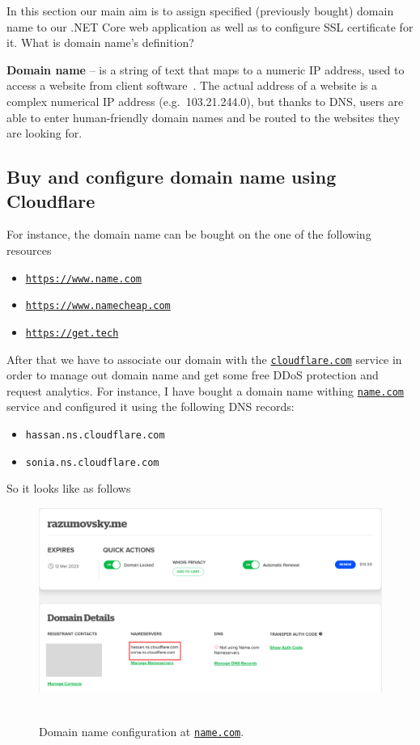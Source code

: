 In this section our main aim is to assign specified (previously bought) domain name to our .NET Core web application
as well as to configure SSL certificate for it.
What is domain name's definition?
\begin{center}
    \textbf{Domain name} -- is a string of text that maps to a numeric IP address, used to access a website
    from client software~\cite{DomanNameCloudflare}.
    The actual address of a website is a complex numerical IP address (e.g.\ 103.21.244.0), but thanks to DNS,
    users are able to enter human-friendly domain names and be routed to the websites they are looking for.
\end{center}

\subsection{Buy and configure domain name using Cloudflare}\label{subsec:buy-and-configure-domain-name-using-cloudflare}
For instance, the domain name can be bought on the one of the following resources
\begin{itemize}
    \item \href{https://www.name.com/}{\texttt{https://www.name.com}}
    \item \href{https://www.namecheap.com/}{\texttt{https://www.namecheap.com}}
    \item \href{https://get.tech/}{\texttt{https://get.tech}}
\end{itemize}
After that we have to associate our domain with the \href{https://www.cloudflare.com/}{\texttt{cloudflare.com}} service in order
to manage out domain name and get some free DDoS protection and request analytics.
For instance, I have bought a domain name withing \href{https://www.name.com/}{\texttt{name.com}} service
and configured it using the following DNS records:
\begin{itemize}
    \item \texttt{hassan.ns.cloudflare.com}
    \item \texttt{sonia.ns.cloudflare.com}
\end{itemize}
So it looks like as follows
\begin{figure}[H]
    \centering
    \includegraphics[width=1\textwidth]{img/07_domain_at_name_com}
    ~\caption{Domain name configuration at \href{https://www.name.com/}{\texttt{name.com}}.}\label{fig:figure18}
\end{figure}
